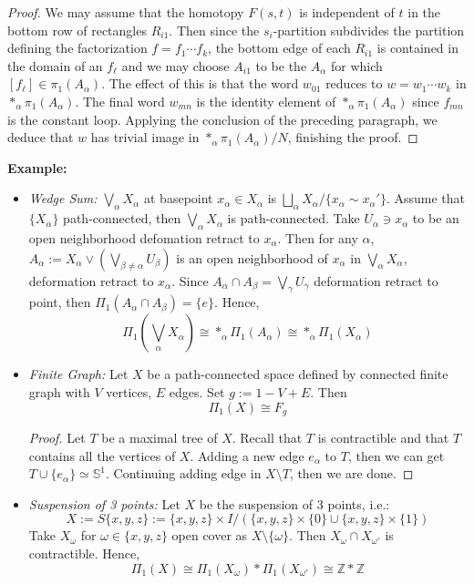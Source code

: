 \begin{proof}
We may assume that the homotopy $F(s,t)$ is independent of $t$ in the bottom row of rectangles $R_{i1}$. Then since the $s_i$-partition subdivides the partition defining the factorization $f = f_1 \cdots f_k$, the bottom edge of each $R_{i1}$ is contained in the domain of an $f_\ell$ and we may choose $A_{i1}$ to be the $A_\alpha$ for which $[f_\ell] \in \pi_1(A_\alpha)$. The effect of this is that the word $w_{01}$ reduces to $w = w_1 \cdots w_k$ in $*_\alpha \pi_1(A_\alpha)$. The final word $w_{mn}$ is the identity element of $*_\alpha \pi_1(A_\alpha)$ since $f_{mn}$ is the constant loop. Applying the conclusion of the preceding paragraph, we deduce that $w$ has trivial image in $*_\alpha \pi_1(A_\alpha)/N$, finishing the proof. 
\end{proof}

\noindent\textbf{Example:}
\begin{itemize}
    \item \textit{Wedge Sum:} $\bigvee_\alpha X_\alpha$ at basepoint $x_\alpha \in X_\alpha$ is $\bigsqcup_\alpha X_\alpha / \{ x_\alpha \sim x_\alpha'\}$. Assume that $\{X_\alpha\}$ path-connected, then $\bigvee_\alpha X_\alpha$ is path-connected. Take $U_\alpha \ni x_\alpha$ to be an open neighborhood defomation retract to $x_\alpha$. Then for any $\alpha$, $A_\alpha := X_\alpha \vee (\bigvee_{\beta \neq \alpha} U_\beta)$ is an open neighborhood of $x_\alpha$ in $\bigvee_\alpha X_\alpha$, deformation retract to $x_\alpha$. Since $A_\alpha \cap A_\beta = \bigvee_\gamma U_\gamma$ deformation retract to point, then $\Pi_1 (A_\alpha \cap A_\beta) =\{e\}$. Hence,
    $$\Pi_1(\bigvee_\alpha X_\alpha) \cong *_\alpha \Pi_1 (A_\alpha) \cong *_\alpha \Pi_1 (X_\alpha)$$

    \item \textit{Finite Graph:} Let $X$ be a path-connected space defined by connected finite graph with $V$ vertices, $E$ edges. Set $g:= 1-V+E$. Then
    $$\Pi_1(X) \cong F_g$$
    \begin{proof}
        Let $T$ be a maximal tree of $X$. Recall that $T$ is contractible and that $T$ contains all the vertices of $X$. Adding a new edge $e_\alpha$ to $T$, then we can get $T \cup \{ e_\alpha\} \simeq \mathbb{S}^1$. Continuing adding edge in $X \setminus T$, then we are done.
    \end{proof}

    \item \textit{Suspension of 3 points:} Let $X$ be the suspension of 3 points, i.e.:
    $$X:= S\{ x,y,z\} := \{x,y,z\} \times I/ (\{x,y,z\} \times \{0\} \cup \{x,y,z\} \times \{1\})$$
    Take $X_\omega$ for $\omega \in \{x,y,z\}$ open cover as $X\setminus \{\omega\}$. Then $X_\omega \cap X_{\omega'}$ is contractible. Hence,
    $$\Pi_1 (X) \cong \Pi_1(X_\omega) * \Pi_1(X_{\omega'}) \cong \mathbb{Z} * \mathbb{Z}$$
\end{itemize}